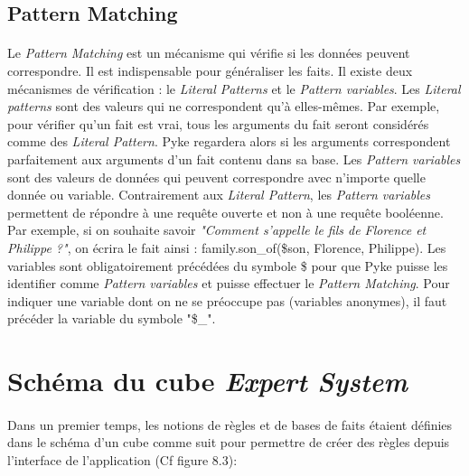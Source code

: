\documentclass {report}
\begin{document}
\subsection{Pattern Matching}
\paragraph{}
Le \textit{Pattern Matching} est un mécanisme qui vérifie si les données peuvent correspondre. Il est indispensable pour généraliser les faits. Il existe deux mécanismes de vérification : le \textit{Literal Patterns} et le \textit{Pattern variables}. Les \textit{Literal patterns} sont des valeurs qui ne correspondent qu'à elles-mêmes. Par exemple, pour vérifier qu'un fait est vrai, tous les arguments du fait seront considérés comme des \textit{Literal Pattern}. Pyke regardera alors si les arguments correspondent parfaitement aux arguments d'un fait contenu dans sa base. Les \textit{Pattern variables} sont des valeurs de données qui peuvent correspondre avec n'importe quelle donnée ou variable. Contrairement aux \textit{Literal Pattern}, les \textit{Pattern variables} permettent de répondre à une requête ouverte et non à une requête booléenne. Par exemple, si on souhaite savoir \textit{"Comment s'appelle le fils de Florence et Philippe ?"}, on écrira le fait ainsi : family.son\_of(\$son, Florence, Philippe). Les variables sont obligatoirement précédées du symbole \$ pour que Pyke puisse les identifier comme \textit{Pattern variables} et puisse effectuer le \textit{Pattern Matching}. Pour indiquer une variable dont on ne se préoccupe pas (variables anonymes), il faut précéder la variable du symbole "\$\_".














\section{Schéma du cube \textit{Expert System}}

\paragraph{}
Dans un premier temps, les notions de règles et de bases de faits étaient définies dans le schéma d'un cube comme suit pour permettre de créer des règles depuis l'interface de l'application (Cf figure 8.3):
\end{document}
